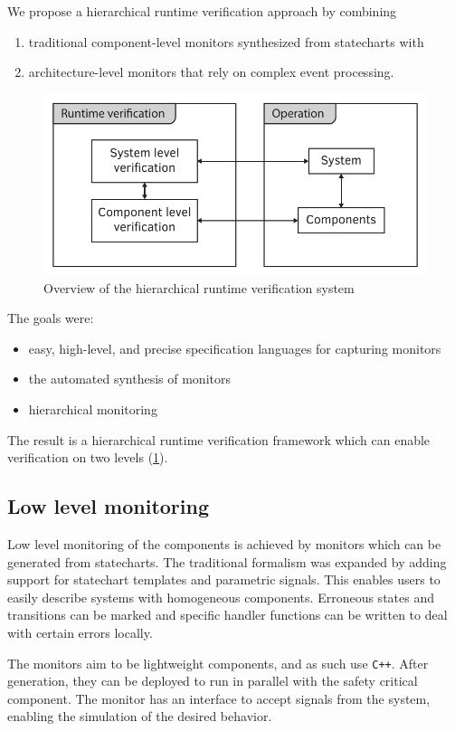 We propose a hierarchical runtime verification approach by combining
\begin{enumerate}
\item traditional component-level monitors synthesized from statecharts with 
\item architecture-level monitors that rely on complex event processing.
\end{enumerate}

\begin{figure}[h]
	\centering
	\includegraphics[width=0.4\linewidth]{include/figures/chapter_1/rv_overview}
	\caption{Overview of the hierarchical runtime verification system}
	\label{fig:intro:concept_component}
\end{figure}

The goals were:
\begin{itemize}
\item easy, high-level, and precise specification languages for capturing monitors
\item the automated synthesis of monitors
\item hierarchical monitoring
\end {itemize}

The result is a hierarchical runtime verification framework which can enable verification on two levels (\cref{fig:intro:concept_component}).

\subsection{Low level monitoring}
Low level monitoring of the components is achieved by monitors which can be generated from statecharts. The traditional formalism was expanded by adding support for statechart templates and parametric signals. This enables users to easily describe systems with homogeneous components. Erroneous states and transitions can be marked and specific handler functions can be written to deal with certain errors locally.

The monitors aim to be lightweight components, and as such use \verb!C++!. After generation, they can be deployed to run in parallel with the safety critical component. The monitor has an interface to accept signals from the system, enabling the simulation of the desired behavior.

